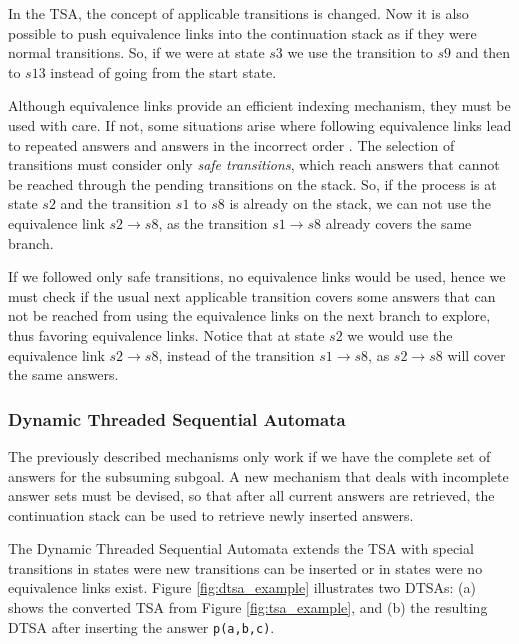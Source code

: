 In the TSA, the concept of applicable transitions is changed. Now it is also possible to push equivalence links
into the continuation stack as if they were normal transitions. So, if we were at state $s3$ we use
the transition to $s9$ and then to $s13$ instead of going from the start state.

Although equivalence links provide an efficient indexing mechanism, they must be used with care. If not,
some situations arise where following equivalence links lead to repeated answers and answers in the
incorrect order \cite{Rao-96}. The selection of transitions must consider only \textit{safe transitions},
which reach answers that cannot be reached through the pending transitions on the stack.
So, if the process is at state $s2$ and the transition $s1$ to $s8$ is already on the
stack, we can not use the equivalence link $s2 \rightarrow s8$, as the transition $s1 \rightarrow s8$
already covers the same branch.

If we followed only safe transitions, no equivalence links would be used, hence we must check if
the usual next applicable transition covers some answers that can not be reached from using the
equivalence links on the next branch to explore, thus favoring equivalence links. Notice that at
state $s2$ we would use the equivalence link $s2 \rightarrow s8$, instead of the transition
$s1 \rightarrow s8$, as $s2 \rightarrow s8$ will cover the same answers.
 
\subsubsection{Dynamic Threaded Sequential Automata}

The previously described mechanisms only work if we have the complete set of answers for the subsuming subgoal.
A new mechanism that deals with incomplete answer sets must be devised, so that after all current answers
are retrieved, the continuation stack can be used to retrieve newly inserted answers.

The Dynamic Threaded Sequential Automata extends the TSA with special transitions in states
were new transitions can be inserted or in states were no equivalence links exist.
Figure \ref{fig:dtsa_example} illustrates two DTSAs: (a) shows the converted TSA from Figure \ref{fig:tsa_example}, and
(b) the resulting DTSA after inserting the answer \texttt{p(a,b,c)}.

